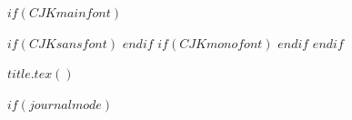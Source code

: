 $if(CJKmainfont)$
    \usepackage{xeCJK}
    $if(CJKsansfont)$
    $endif$
    $if(CJKmonofont)$
    $endif$
$endif$

$title.tex()$

$if(journalmode)$
\usepackage{pbalance}
\makeatletter
\let\oldtpt\ThreePartTable
\let\endoldtpt\endThreePartTable
\def\ThreePartTable{\@ifnextchar[\ThreePartTable@i \ThreePartTable@ii}
\def\ThreePartTable@i[#1]{\begin{figure}[!htbp]
\onecolumn
\begin{minipage}{0.485\textwidth}
\oldtpt[#1]
}
\def\ThreePartTable@ii{\begin{figure}[!htbp]
\onecolumn
\begin{minipage}{0.48\textwidth}
\oldtpt
}
\def\endThreePartTable{
\endoldtpt
\end{minipage}
\twocolumn
\end{figure}}
\makeatother


\makeatletter
\newif\ifapatablesownrule
\def\apatablesownbottomrule{\global\apatablesownruletrue}
\let\endoldlt\endlongtable
\def\endlongtable{
\ifapatablesownrule\noalign{\global\apatablesownrulefalse}\else\hline\fi
\endoldlt}
\makeatother

